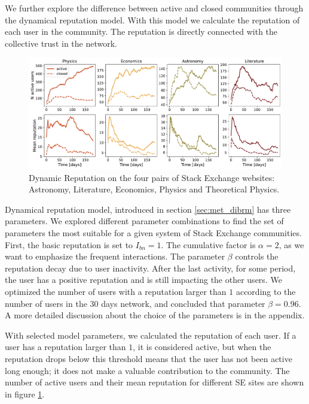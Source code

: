 We further explore the difference between active and closed communities through the dynamical reputation model. With this model we calculate the reputation of each user in the community. The reputation is directly connected with the collective trust in the network. 

\begin{figure}[h]
	\centering
	\includegraphics[width=\linewidth]{figures/stackexchange/reputation.pdf}
	\caption[Dynamic Reputation of Stack Exchange websites.]{Dynamic Reputation on the four pairs of Stack Exchange websites: Astronomy, Literature, Economics,  Physics and Theoretical Physics.}
	\label{fig:dr6panel}
\end{figure}

Dynamical reputation model, introduced in section \ref{sec:met_dibrm} has three parameters. We explored different parameter combinations to find the set of parameters the most suitable for a given system of Stack Exchange communities. First, the basic reputation is set to $I_{bn}=1$. The cumulative factor is $\alpha=2$, as we want to emphasize the frequent interactions. The parameter $\beta$ controls the reputation decay due to user inactivity. After the last activity, for some period, the user has a positive reputation and is still impacting the other users. We optimized the number of users with a reputation larger than $1$ according to the number of users in the 30 days network, and concluded that parameter $\beta=0.96$. A more detailed discussion about the choice of the parameters is in the appendix. 

With selected model parameters, we calculated the reputation of each user. If a user has a reputation larger than $1$, it is considered active, but when the reputation drops below this threshold means that the user has not been active long enough; it does not make a valuable contribution to the community. The number of active users and their mean reputation for different SE sites are shown in figure \ref{fig:dr6panel}. 

